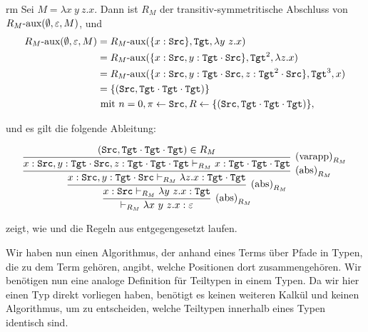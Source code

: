 \begin{example}{}{rm}
    Sei $M=\lambda x~y~z.x$. Dann ist $R_M$ der transitiv-symmetritische Abschluss von $R_M\text{-aux}(\emptyset, \varepsilon, M)$, und    
    \begin{align*}
    R_M\text{-aux}(\emptyset, \varepsilon, M) &= R_M\text{-aux}(\{x:\texttt{Src}\}, \texttt{Tgt}, \lambda y~z.x) \\
    &=R_M\text{-aux}(\{x:\texttt{Src}, y:\texttt{Tgt}\cdot\texttt{Src}\}, \texttt{Tgt}^2, \lambda z.x)\\
    &=R_M\text{-aux}(\{x:\texttt{Src}, y:\texttt{Tgt}\cdot\texttt{Src}, z:\texttt{Tgt}^2\cdot\texttt{Src}\}, \texttt{Tgt}^3, x) \\
    &= \{(\texttt{Src}, \texttt{Tgt}\cdot\texttt{Tgt}\cdot\texttt{Tgt})\}\\
    & \text{ mit } n = 0, \pi \leftarrow \texttt{Src}, R\leftarrow \{(\texttt{Src}, \texttt{Tgt}\cdot\texttt{Tgt}\cdot\texttt{Tgt})\}, 
    \end{align*}           
    
    und es gilt die folgende Ableitung:
    
    \[\infer[\abs_{R_M}]{\vdash_{R_M} \lambda x~y~z.x : \varepsilon}{
        \infer[\abs_{R_M}]{x:\src\vdash_{R_M} \lambda y~z.x:\tgt}{
            \infer[\abs_{R_M}]{x:\src, y:\tgt\cdot\src\vdash_{R_M}\lambda z.x:\tgt\cdot\tgt}{
                \infer[\varapp_{R_M}]{x:\src, y:\tgt\cdot\src, z:\tgt\cdot\tgt\cdot\tgt\vdash_{R_M} x: \tgt\cdot\tgt\cdot\tgt}{(\src,\tgt\cdot\tgt\cdot\tgt)\in R_M}
        }}}    
    \]    
\end{example}

 zeigt, wie  und die Regeln aus  entgegengesetzt laufen.

Wir haben nun einen Algorithmus, der anhand eines Terms über Pfade in Typen, die zu dem Term gehören, angibt, welche Positionen dort zusammengehören. Wir benötigen nun eine analoge Definition für Teiltypen in einem Typen. Da wir hier einen Typ direkt vorliegen haben, benötigt es keinen weiteren Kalkül und keinen Algorithmus, um zu entscheiden, welche Teiltypen innerhalb eines Typen identisch sind.

